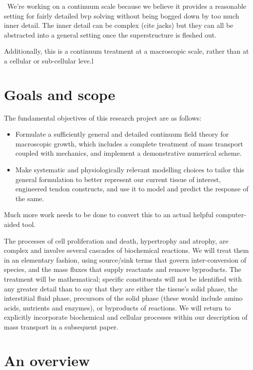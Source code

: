 \textbullet\ We're working on a continuum scale because we believe it provides a
reasonable setting for fairly detailed bvp solving without being
bogged down by too much inner detail. The inner detail can be complex
(cite jacks) but they can all be abstracted into a general setting
once the superstructure is fleshed out.

 Additionally,
this is a continuum treatment at a macroscopic scale, rather than at a
cellular or sub-cellular leve.l

\section{Goals and scope}
\label{goals}

The fundamental objectives of this research project are as follows:

\begin{itemize}
\item Formulate a sufficiently general and detailed continuum field
  theory for macroscopic growth, which includes a complete treatment
  of mass transport coupled with mechanics, and implement a
  demonstrative numerical scheme.
\item Make systematic and physiologically relevant modelling choices
  to tailor this general formulation to better represent our current
  tissue of interest, engineered tendon constructs, and use it to
  model and predict the response of the same.
\end{itemize}

Much more work needs to be done to convert this to an actual
helpful computer-aided tool.

The processes of cell proliferation and death, hypertrophy and
atrophy, are complex and involve several cascades of biochemical
reactions. We will treat them in an elementary fashion, using
source/sink terms that govern inter-conversion of species, and the
mass fluxes that supply reactants and remove byproducts. The
treatment will be mathematical; specific constituents will not be
identified with any greater detail than to say that they are
either the tissue's solid phase, the interstitial fluid phase,
precursors of the solid phase (these would include amino acids,
nutrients and enzymes), or byproducts of reactions. We will return
to explicitly incorporate biochemical and cellular processes
within our description of mass transport in a subsequent paper.

\section{An overview}
\label{overview}

